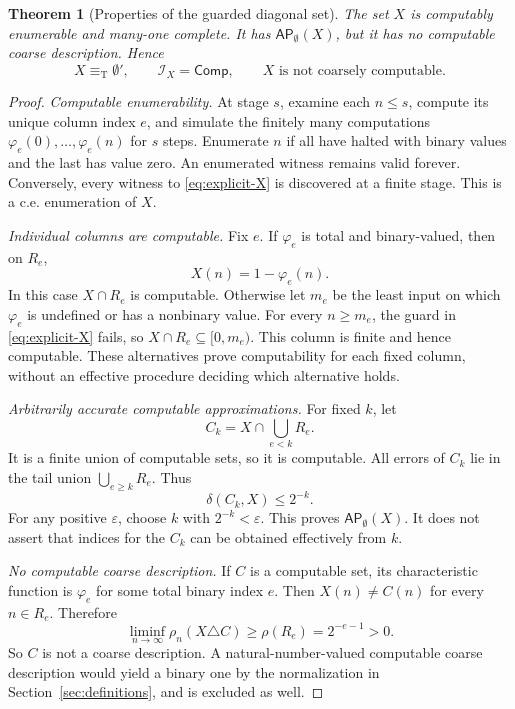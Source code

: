 \documentclass[11pt,a4paper]{article}
\newcommand{\eqT}{\equiv_{\mathrm T}}
\newcommand{\core}{\mathcal I}
\newcommand{\Comp}{\mathsf{Comp}}
\newcommand{\AP}{\mathsf{AP}}
\newtheorem{theorem}{Theorem}[section]
\theoremstyle{definition}\newtheorem{definition}[theorem]{Definition}
\theoremstyle{remark}\newtheorem{remark}[theorem]{Remark}
\begin{document}
\begin{theorem}[Properties of the guarded diagonal set]\label{thm:X}
The set $X$ is computably enumerable and many-one complete. It has
$\AP_{\emptyset}(X)$, but it has no computable coarse description. Hence
\[
 X\eqT\emptyset',\qquad \core_X=\Comp,
 \qquad X\text{ is not coarsely computable}.
\]
\end{theorem}
\begin{proof}
\emph{Computable enumerability.} At stage $s$, examine each $n\le s$, compute
its unique column index $e$, and simulate the finitely many computations
$\varphi_e(0),\ldots,\varphi_e(n)$ for $s$ steps. Enumerate $n$ if all have
halted with binary values and the last has value zero. An enumerated witness
remains valid forever. Conversely, every witness to \eqref{eq:explicit-X}
is discovered at a finite stage. This is a c.e. enumeration of $X$.

\emph{Individual columns are computable.} Fix $e$. If $\varphi_e$ is total
and binary-valued, then on $R_e$,
\[
 X(n)=1-\varphi_e(n).
\]
In this case $X\cap R_e$ is computable. Otherwise let $m_e$ be the least input
on which $\varphi_e$ is undefined or has a nonbinary value. For every
$n\ge m_e$, the guard in \eqref{eq:explicit-X} fails, so
$X\cap R_e\subseteq[0,m_e)$. This column is finite and hence computable.
These alternatives prove computability for each fixed column, without an
effective procedure deciding which alternative holds.

\emph{Arbitrarily accurate computable approximations.} For fixed $k$, let
\[
 C_k=X\cap\bigcup_{e<k}R_e.
\]
It is a finite union of computable sets, so it is computable. All errors of
$C_k$ lie in the tail union $\bigcup_{e\ge k}R_e$. Thus
\begin{equation}\label{eq:approx-rate}
 \delta(C_k,X)\le2^{-k}.
\end{equation}
For any positive $\varepsilon$, choose $k$ with $2^{-k}<\varepsilon$.
This proves $\AP_{\emptyset}(X)$. It does not assert that indices for the
$C_k$ can be obtained effectively from $k$.

\emph{No computable coarse description.} If $C$ is a computable set, its
characteristic function is $\varphi_e$ for some total binary index $e$.
Then $X(n)\ne C(n)$ for every $n\in R_e$. Therefore
\[
 \liminf_{n\to\infty}\rho_n(X\triangle C)
 \ge \rho(R_e)=2^{-e-1}>0.
\]
So $C$ is not a coarse description. A natural-number-valued computable coarse
description would yield a binary one by the normalization in
Section~\ref{sec:definitions}, and is excluded as well.


\end{proof}
\end{document}
